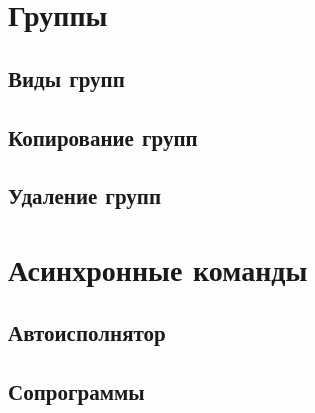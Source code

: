 \documentclass[10pt]{book}
\begin{document}
	\chapter{Группы}
	
	\section{Виды групп}
	
	\section{Копирование групп}
	
	\section{Удаление групп}
	
	\chapter{Асинхронные команды}
	
	\section{Автоисполнятор}
	
	\section{Сопрограммы}
	
	
\end{document}
